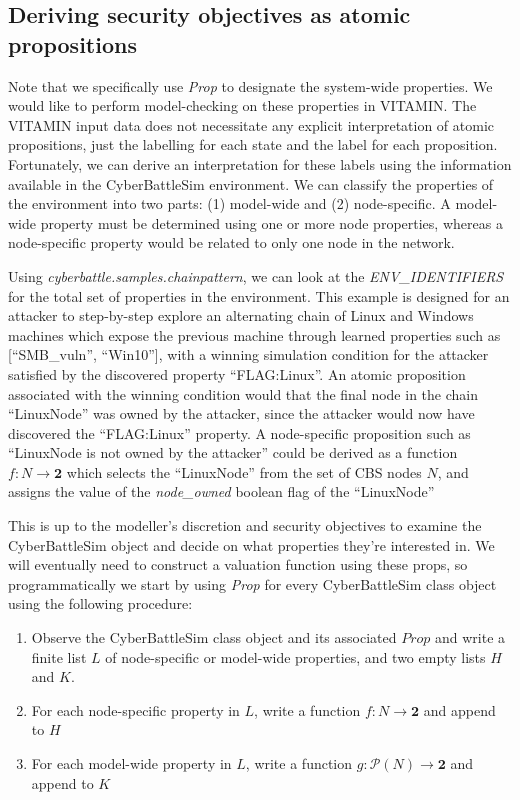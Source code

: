 \subsection{Deriving security objectives as atomic propositions}
Note that we specifically use \textit{Prop} to designate the system-wide properties. We would like to perform model-checking on these properties in VITAMIN. The VITAMIN input data does not necessitate any explicit interpretation of atomic propositions, just the labelling for each state and the label for each proposition. Fortunately, we can derive an interpretation for these labels using the information available in the CyberBattleSim environment. We can classify the properties of the environment into two parts: (1) model-wide and (2) node-specific. A model-wide property must be determined using one or more node properties, whereas a node-specific property would be related to only one node in the network.
\begin{mdframed}
\begin{example}
Using \textit{cyberbattle.samples.chainpattern}, we can look at the \textit{ENV\_IDENTIFIERS} for the total set of properties in the environment. This example is designed for an attacker to step-by-step explore an alternating chain of Linux and Windows machines which expose the previous machine through learned properties such as [``SMB\_vuln'', ``Win10''], with a winning simulation condition for the attacker satisfied by the discovered property ``FLAG:Linux''. An atomic proposition associated with the winning condition would that the final node in the chain ``LinuxNode'' was owned by the attacker, since the attacker would now have discovered the ``FLAG:Linux'' property. A node-specific proposition such as ``LinuxNode is not owned by the attacker'' could be derived as a function $f: N \rightarrow \mathbf{2}$ which selects the ``LinuxNode'' from the set of CBS nodes $N$, and assigns the value of the \textit{node\_owned} boolean flag of the ``LinuxNode''


\end{example}

\end{mdframed}

This is up to the modeller's discretion and security objectives to examine the CyberBattleSim object and decide on what properties they're interested in.
We will eventually need to construct a valuation function using these props, so programmatically we start by using \textit{Prop} for every CyberBattleSim class object using the following procedure:
\begin{enumerate}
    \item Observe the CyberBattleSim class object and its associated $Prop$ and write a finite list $L$ of node-specific or model-wide properties, and two empty lists $H$ and $K$.
    \item For each node-specific property in $L$, write a function $f: N \rightarrow \mathbf{2}$ and append to $H$
    \item For each model-wide property in $L$, write a function $g: \mathcal{P}(N) \rightarrow \mathbf{2}$ and append to $K$
\end{enumerate}


